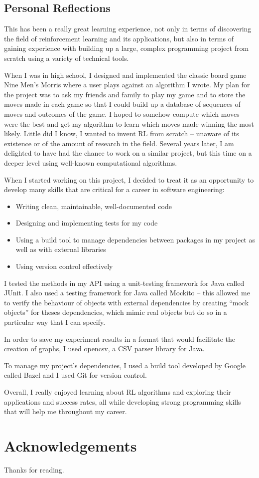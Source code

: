 \documentclass[11pt,a4paper]{report}
\begin{document}
\section{Personal Reflections}

This has been a really great learning experience, not only in terms of discovering the field of reinforcement learning and its applications, but also in terms of gaining experience with building up a large, complex programming project from scratch using a variety of technical tools.

When I was in high school, I designed and implemented the classic board game Nine Men’s Morris where a user plays against an algorithm I wrote. My plan for the project was to ask my friends and family to play my game and to store the moves made in each game so that I could build up a database of sequences of moves and outcomes of the game. I hoped to somehow compute which moves were the best and get my algorithm to learn which moves made winning the most likely. Little did I know, I wanted to invent RL from scratch – unaware of its existence or of the amount of research in the field. Several years later, I am delighted to have had the chance to work on a similar project, but this time on a deeper level using well-known computational algorithms.

When I started working on this project, I decided to treat it as an opportunity to develop many skills that are critical for a career in software engineering:

\begin{itemize}
	\item Writing clean, maintainable, well-documented code
	\item Designing and implementing tests for my code
	\item Using a build tool to manage dependencies between packages in my project as well as with external libraries
	\item Using version control effectively
\end{itemize}

I tested the methods in my API using a unit-testing framework for Java called JUnit. I also used a testing framework for Java called Mockito – this allowed me to verify the behaviour of objects with external dependencies by creating “mock objects” for theses dependencies, which mimic real objects but do so in a particular way that I can specify.

In order to save my experiment results in a format that would facilitate the creation of graphs, I used opencsv, a CSV parser library for Java.

To manage my project’s dependencies, I used a build tool developed by Google called Bazel and I used Git for version control.

Overall, I really enjoyed learning about RL algorithms and exploring their applications and success rates, all while developing strong programming skills that will help me throughout my career.


\chapter{Acknowledgements}

Thanks for reading.
\end{document}
